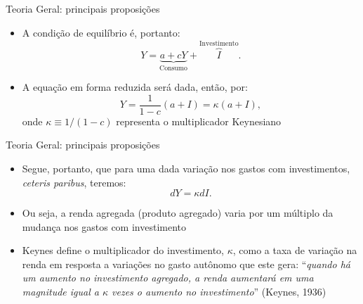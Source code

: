 \documentclass[10pt]{beamer}
\begin{document}
\begin{frame}{Teoria Geral: principais proposições}
    \begin{itemize}
        \item A condição de equilíbrio é, portanto:
        \begin{equation}
            Y = \underbrace{a + cY}_{\text{Consumo}} + \overbrace{I}^{\text{Investimento}}.
            \label{eq3}
        \end{equation}
        \bigskip
        \item A equação em forma reduzida será dada, então, por:
        \begin{equation}
            Y = \frac{1}{1 - c}(a + I) = \kappa (a + I),
            \label{eq4}
        \end{equation}
        onde $\kappa \equiv 1/(1 - c)$ representa o multiplicador Keynesiano
    \end{itemize}
\end{frame}

\begin{frame}{Teoria Geral: principais proposições}
    \begin{itemize}
        \item Segue, portanto, que para uma dada variação nos gastos com investimentos, \emph{ceteris paribus}, teremos:
        \begin{equation}
            dY = \kappa dI.
            \label{eq5}
        \end{equation}
        \bigskip
        \item Ou seja, a renda agregada (produto agregado) varia por um múltiplo da mudança nos gastos com investimento
        \bigskip
        \item Keynes define o multiplicador do investimento, $\kappa$, como a taxa de variação na renda em resposta a variações no gasto autônomo que este gera: ``\emph{quando há um aumento no investimento agregado, a renda aumentará em uma magnitude igual a $\kappa$ vezes o aumento no investimento}'' (Keynes, 1936)
    \end{itemize}
\end{frame}
\end{document}
